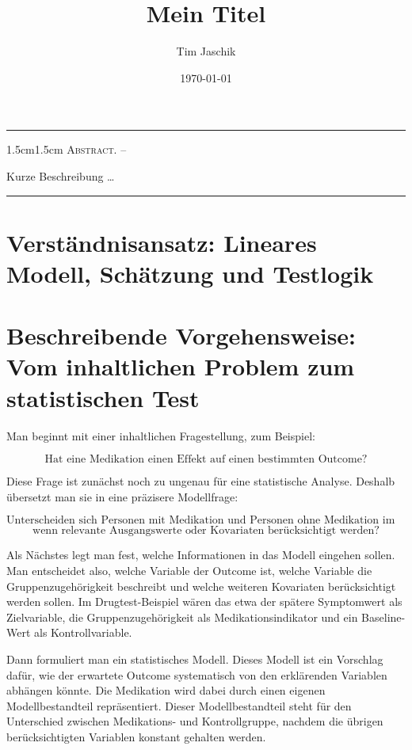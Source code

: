 \documentclass[10pt, letterpaper]{article}
\title{Mein Titel}
\author{Tim Jaschik}
\date{\today}
\renewenvironment{abstract}
  {
    \begin{adjustwidth}{1.5cm}{1.5cm}
    \small
    \textsc{Abstract. –}%
  }
  {
    \end{adjustwidth}
  }
\begin{document}
\maketitle
\rule{\textwidth}{0.5pt}
\begin{abstract}
Kurze Beschreibung …
\end{abstract}
\rule{\textwidth}{0.5pt}
\vspace{0.5cm}

\tableofcontents

\pagebreak


\section{Verständnisansatz: Lineares Modell, Schätzung und Testlogik}


\section{Beschreibende Vorgehensweise: Vom inhaltlichen Problem zum statistischen Test}

Man beginnt mit einer inhaltlichen Fragestellung, zum Beispiel:

\[
\text{Hat eine Medikation einen Effekt auf einen bestimmten Outcome?}
\]

Diese Frage ist zunächst noch zu ungenau für eine statistische Analyse. Deshalb übersetzt man sie in eine präzisere Modellfrage:

\[
\text{Unterscheiden sich Personen mit Medikation und Personen ohne Medikation im erwarteten Outcome,}
\]
\[
\text{wenn relevante Ausgangswerte oder Kovariaten berücksichtigt werden?}
\]

Als Nächstes legt man fest, welche Informationen in das Modell eingehen sollen. Man entscheidet also, welche Variable der Outcome ist, welche Variable die Gruppenzugehörigkeit beschreibt und welche weiteren Kovariaten berücksichtigt werden sollen. Im Drugtest-Beispiel wären das etwa der spätere Symptomwert als Zielvariable, die Gruppenzugehörigkeit als Medikationsindikator und ein Baseline-Wert als Kontrollvariable.

Dann formuliert man ein statistisches Modell. Dieses Modell ist ein Vorschlag dafür, wie der erwartete Outcome systematisch von den erklärenden Variablen abhängen könnte. Die Medikation wird dabei durch einen eigenen Modellbestandteil repräsentiert. Dieser Modellbestandteil steht für den Unterschied zwischen Medikations- und Kontrollgruppe, nachdem die übrigen berücksichtigten Variablen konstant gehalten werden.
\end{document}
